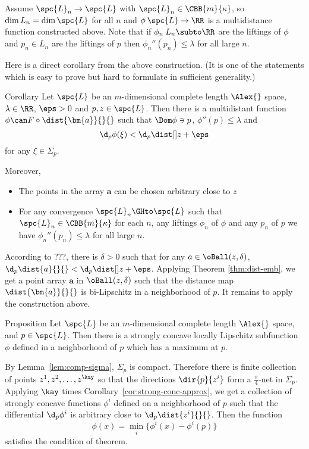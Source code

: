 Assume $\spc{L}_n\to\spc{L}$ with $\spc{L}_n\in\CBB{m}{\kappa}$, so $\dim{L}_n=\dim\spc{L}$ for all $n$
and $\phi\:\spc{L}\to \RR$ 
is a multidistance function constructed above. 
Note that if $\phi_n\:{L}_n\subto\RR$ are the liftings of $\phi$ and $p_n\in{L}_n$ are the liftings of $p$
then $\phi_n''(p_n)\le\lambda$ for all large $n$.
\qeds

Here is a direct corollary from the above construction.
(It is one of the statements which is easy to prove but hard to formulate in sufficient generality.)

\begin{thm}{Corollary}%
\label{cor:strong-conc-approx}
Let $\spc{L}$ be an $m$-dimensional complete length $\Alex{}$ space, 
$\lambda\in\RR$,
$\eps>0$
and $p,z\in \spc{L}$.
Then there is a multidistant function 
$\phi\can F\circ\dist{\bm{a}}{}{}$
such that $\Dom\phi\ni p$,
$\phi''(p)\le\lambda$ and
$$\d_p\phi(\xi)<\d_p\dist[{{}}]{z}{}{}+\eps$$
for any $\xi\in\Sigma_p$.

Moreover, 
\begin{itemize}
 \item The points in the array $\bm{a}$ can be chosen arbitrary close to $z$
 \item For any convergence $\spc{L}_n\GHto\spc{L}$
such that
$\spc{L}_n\in\CBB{m}{\kappa}$ for each $n$,
any liftings $\phi_n$ of $\phi$ and 
any $p_n$ of $p$ we have
$\phi_n''(p_n)\le\lambda$ for all large $n$.
\end{itemize}
\end{thm}

According to ???,
there is $\delta>0$ such that for any $a\in \oBall(z,\delta)$,
$\d_p\dist{a}{}{}<\d_p\dist[{{}}]{z}{}{}+\eps$.
Applying Theorem \ref{thm:dist-emb},
we get a point array $\bm{a}$ in $\oBall(z,\delta)$ such that
the distance map $\dist{\bm{a}}{}{}$ is bi-Lipschitz in a neighborhood of $p$.
It remains to apply the construction above.
\qeds


\begin{thm}{Proposition}\label{prop:convex-function}
Let $\spc{L}$ be an $m$-dimensional complete length $\Alex{}$ space, 
and $p\in\spc{L}$.
Then there is a strongly concave locally Lipschitz subfunction $\phi$
defined in a neighborhood of $p$ which has a maximum at $p$.
\end{thm}

By Lemma~\ref{lem:comp-sigma}, $\Sigma_p$ is compact.
Therefore there is finite collection of points $z^1,z^2,\dots,z^\kay$
so that the directions $\dir{p}{z^i}$ form a $\tfrac\pi4$-net in $\Sigma_p$.
Applying $\kay$ times Corollary~\ref{cor:strong-conc-approx},
we get a collection of strongly concave functions $\phi^i$ 
defined on a neighborhood of $p$
such that the differential $\d_p\phi^i$ is arbitrary close to $\d_p\dist{z^i}{}{}$.
Then the function 
\[\phi(x)=\min_i\{\phi^i(x)-\phi^i(p)\}\]
satisfies the condition of theorem.

